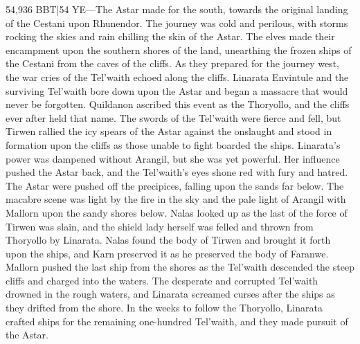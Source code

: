 \documentclass[smalldemyvopaper,11pt,twoside,onecolumn,openright,extrafontsizes]{memoir}
\begin{document}
{{54,936 BBT|54 YE—The Astar made for the south, towards the original landing of the Cestani upon Rhunendor. The journey was cold and perilous, with storms rocking the skies and rain chilling the skin of the Astar. The elves made their encampment upon the southern shores of the land, unearthing the frozen ships of the Cestani from the caves of the cliffs. As they prepared for the journey west, the war cries of the Tel’waith echoed along the cliffs. Linarata Envintule and the surviving Tel’waith bore down upon the Astar and began a massacre that would never be forgotten. Quildanon ascribed this event as the Thoryollo, and the cliffs ever after held that name. The swords of the Tel’waith were fierce and fell, but Tirwen rallied the icy spears of the Astar against the onslaught and stood in formation upon the cliffs as those unable to fight boarded the ships. Linarata’s power was dampened without Arangil, but she was yet powerful. Her influence pushed the Astar back, and the Tel’waith’s eyes shone red with fury and hatred. The Astar were pushed off the precipices, falling upon the sands far below. The macabre scene was light by the fire in the sky and the pale light of Arangil with Mallorn upon the sandy shores below. Nalas looked up as the last of the force of Tirwen was slain, and the shield lady herself was felled and thrown from Thoryollo by Linarata. Nalas found the body of Tirwen and brought it forth upon the ships, and Karn preserved it as he preserved the body of Faranwe. Mallorn pushed the last ship from the shores as the Tel’waith descended the steep cliffs and charged into the waters. The desperate and corrupted Tel’waith drowned in the rough waters, and Linarata screamed curses after the ships as they drifted from the shore.
	In the weeks to follow the Thoryollo, Linarata crafted ships for the remaining one-hundred Tel’waith, and they made pursuit of the Astar.

}}
\end{document}
